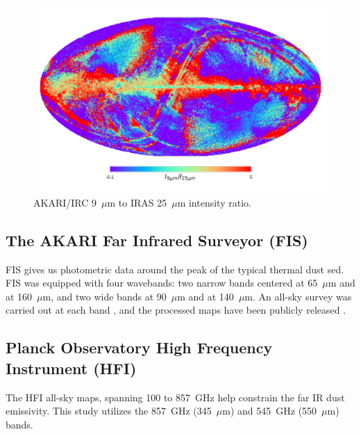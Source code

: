              \begin{figure}
               \centering
               \includegraphics[width=\textwidth]{../Plots/ch_datasources/ratioMap_A9I25.pdf}
               \caption{ AKARI/IRC 9~$\mu$m to IRAS 25~$\mu$m intensity ratio.}
               \label{fig:ratioMap_A9I25}
             \end{figure}

    \subsection{The AKARI Far Infrared Surveyor (FIS)}
       FIS gives us photometric data around the peak of the typical thermal dust \acrshort{sed}. FIS was equipped with four wavebands: two narrow bands centered at 65~$\mu$m and at 160~$\mu$m, and two wide bands at 90~$\mu$m and at 140~$\mu$m. An all-sky survey was carried out at each band \citep{kawada07}, and the processed maps have been publicly released \citep{doi15}.

    \subsection{Planck Observatory High Frequency Instrument (HFI)}
       The HFI all-sky maps, spanning 100 to 857~GHz \citep{hfi14viii} help constrain the far IR dust emissivity. This study utilizes the 857~GHz (345~$\mu$m) and 545~GHz (550~$\mu$m) bands.

